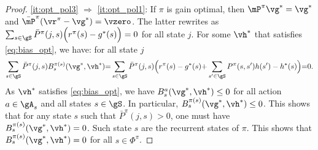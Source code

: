 \begin{proof}
    \ref{it:opt_pol3} $\Rightarrow$ \ref{it:opt_pol1}: If $\pi$ is gain optimal, then $\mP^\pi \vg^*=\vg^*$ and $\bar{\mP}^\pi(\vr^\pi-\vg^*)=\vzero$.
    The latter rewrites as $\sum_{s\in\gS}\bar{P}^\pi(j,s)\Big(r^{\pi}(s)-g^*(s)\Big) =0$ for all state $j$. For some $\vh^*$ that satisfies \eqref{eq:bias_opt}, we have: for all state $j$
    \begin{align*}
        \sum_{s\in\gS}\bar{P}^\pi(j,s)B^{\pi(s)}_s(\vg^*,\vh^*) {=} \sum_{s\in\gS}\bar{P}^\pi(j,s)\Big(r^{\pi}(s)-g^*(s) {+}\sum_{s'\in\gS}P^{\pi}(s,s')h(s') -h^*(s)\Big) {=}0.
    \end{align*}
    As $\vh^*$ satisfies \eqref{eq:bias_opt}, we have $B^{a}_s(\vg^*,\vh^*) \le0$  for all action $a\in\gA_s$ and all states $s\in\gS$. In particular, $B^{\pi(s)}_s(\vg^*,\vh^*) \le0$.
    This shows that for any state $s$ such that $\bar{P}^\pi(j,s)>0$, one must have $B^{\pi(s)}_s(\vg^*,\vh^*) =0$. Such state $s$ are the recurrent states of $\pi$.
    This shows that $B^{\pi(s)}_s(\vg^*,\vh^*) =0$ for all $s\in\Phi^\pi$.
\end{proof}

